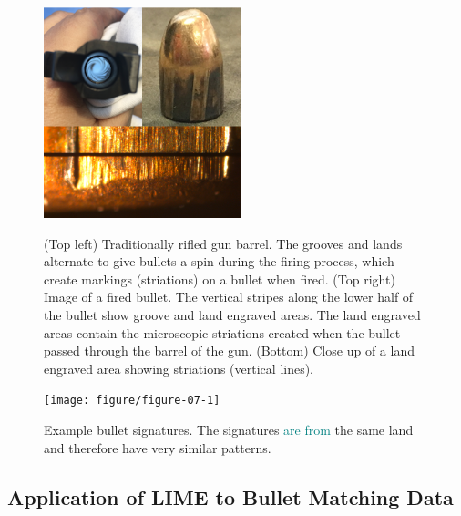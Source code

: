 \documentclass[AMS,STIX2COL]{WileyNJD-v2}\usepackage[]{graphicx}\usepackage[]{color}
\newenvironment{knitrout}{}{} %
\newcommand{\kge}[1]{\textcolor{teal}{#1}}
\renewcommand{\sout}[1]{\unskip}
\begin{document}
\begin{figure}[!t]
\centering
\begin{knitrout}
\color{fgcolor}

{\centering \includegraphics[width=2.25in]{figure-static/figure-06-1} 

}



\end{knitrout}
\caption{(Top left) Traditionally rifled gun barrel. The grooves and lands alternate to give bullets a spin during the firing process, which create markings (striations) on a bullet when fired. (Top right) Image of a fired bullet. The vertical stripes along the lower half of the bullet show groove and land engraved areas. The land engraved areas contain the microscopic striations created when the bullet passed through the barrel of the gun. (Bottom) Close up of a land engraved area showing striations (vertical lines).}
\label{fig:figure-06}

\vspace*{\floatsep}

\begin{knitrout}
\color{fgcolor}

{\centering \texttt{[image: figure/figure-07-1]} 

}



\end{knitrout}
\caption{Example bullet signatures. The \sout{bullet} signatures \kge{are from} \sout{correspond to} the same land and therefore have very similar patterns. \sout{The \citet{hare:2017} random forest is fit using various features that measure the similarity between two such signatures.}}
\label{fig:figure-07}
\end{figure}

\subsection{Application of LIME to Bullet Matching Data}
\end{document}
